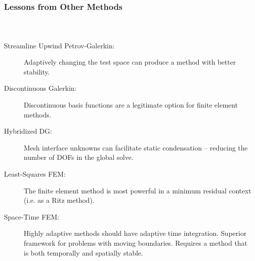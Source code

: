 \documentclass[18pt,xcolor=table]{beamer}
\begin{document}
\begin{frame}[t]
\end{frame}

\begin{frame}[t]
\frametitle{Lessons from Other Methods}
\framesubtitle{~~}
\begin{description}
  \item[Streamline Upwind Petrov-Galerkin:] Adaptively changing the test space can produce a method with better stability.
  \item[Discontinuous Galerkin:] Discontinuous basis functions are a legitimate option for finite element methods.
  \item[Hybridized DG:] Mesh interface unknowns can facilitate static condensation -- reducing the number of DOFs in the global solve.
  \item[Least-Squares FEM:] The finite element method is most powerful in a minimum residual context (i.e. as a Ritz method).
  \item[Space-Time FEM:] Highly adaptive methods should have adaptive time integration. 
  Superior framework for problems with moving boundaries.
  Requires a method that is both temporally and spatially stable.
\end{description}




\end{frame}
\end{document}
